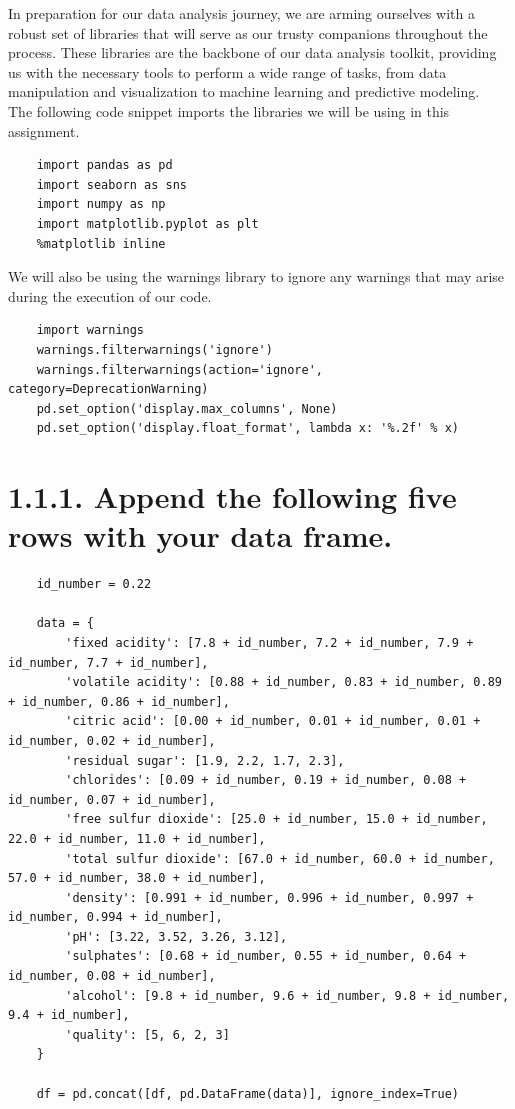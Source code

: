\documentclass{report}
\begin{document}
In preparation for our data analysis journey, we are arming ourselves with a robust set of libraries that will serve as our trusty companions throughout the process. These libraries are the backbone of our data analysis toolkit,
providing us with the necessary tools to perform a wide range of tasks, from data manipulation and visualization to machine learning and predictive modeling.\\
The following code snippet imports the libraries we will be using in this assignment.\\

\begin{lstlisting}
    import pandas as pd
    import seaborn as sns
    import numpy as np
    import matplotlib.pyplot as plt
    %matplotlib inline
\end{lstlisting}

\vspace*{0.5cm}

We will also be using the warnings library to ignore any warnings that may arise during the execution of our code.\\
\begin{lstlisting}
    import warnings
    warnings.filterwarnings('ignore')
    warnings.filterwarnings(action='ignore', category=DeprecationWarning)
    pd.set_option('display.max_columns', None)
    pd.set_option('display.float_format', lambda x: '%.2f' % x)
\end{lstlisting}

\pagebreak
\section*{1.1.1. Append the following five rows with your data frame.}

\begin{lstlisting}
    id_number = 0.22

    data = {
        'fixed acidity': [7.8 + id_number, 7.2 + id_number, 7.9 + id_number, 7.7 + id_number],
        'volatile acidity': [0.88 + id_number, 0.83 + id_number, 0.89 + id_number, 0.86 + id_number],
        'citric acid': [0.00 + id_number, 0.01 + id_number, 0.01 + id_number, 0.02 + id_number],
        'residual sugar': [1.9, 2.2, 1.7, 2.3],
        'chlorides': [0.09 + id_number, 0.19 + id_number, 0.08 + id_number, 0.07 + id_number],
        'free sulfur dioxide': [25.0 + id_number, 15.0 + id_number, 22.0 + id_number, 11.0 + id_number],
        'total sulfur dioxide': [67.0 + id_number, 60.0 + id_number, 57.0 + id_number, 38.0 + id_number],
        'density': [0.991 + id_number, 0.996 + id_number, 0.997 + id_number, 0.994 + id_number],
        'pH': [3.22, 3.52, 3.26, 3.12],
        'sulphates': [0.68 + id_number, 0.55 + id_number, 0.64 + id_number, 0.08 + id_number],
        'alcohol': [9.8 + id_number, 9.6 + id_number, 9.8 + id_number, 9.4 + id_number],
        'quality': [5, 6, 2, 3]
    }
    
    df = pd.concat([df, pd.DataFrame(data)], ignore_index=True)
    
\end{lstlisting}
\end{document}
